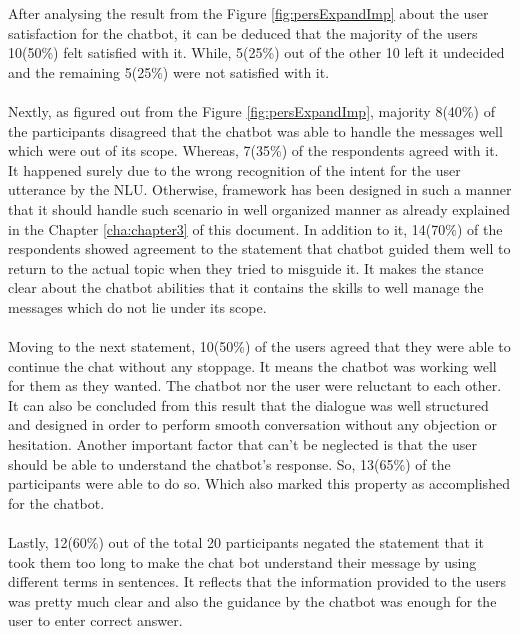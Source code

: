 After analysing the result from the Figure \ref{fig:persExpandImp} about the user satisfaction for the chatbot, it can be deduced that the majority of the users 10(50\%) felt satisfied with it. While, 5(25\%) out of the other 10 left it undecided and the remaining 5(25\%) were not satisfied with it.
\\~\\
Nextly, as figured out from the Figure \ref{fig:persExpandImp}, majority 8(40\%) of the participants disagreed that the chatbot was able to handle the messages well which were out of its scope. Whereas, 7(35\%) of the respondents agreed with it. It happened surely due to the wrong recognition of the intent for the user utterance by the NLU. Otherwise, framework has been designed in such a manner that it should handle such scenario in well organized manner as already explained in the Chapter \ref{cha:chapter3} of this document. In addition to it, 14(70\%) of the respondents showed agreement to the statement that chatbot guided them well to return to the actual topic when they tried to misguide it. It makes the stance clear about the chatbot abilities that it contains the skills to well manage the messages which do not lie under its scope.
\\~\\
Moving to the next statement, 10(50\%) of the users agreed that they were able to continue the chat without any stoppage. It means the chatbot was working well for them as they wanted. The chatbot nor the user were reluctant to each other. It can also be concluded from this result that the dialogue was well structured and designed in order to perform smooth conversation without any objection or hesitation. Another important factor that can't be neglected is that the user should be able to understand the chatbot's response. So, 13(65\%) of the participants were able to do so. Which also marked this property as accomplished for the chatbot.
\\~\\
Lastly, 12(60\%) out of the total 20 participants negated the statement that it took them too long to make the chat bot understand their message by using different terms in sentences. It reflects that the information provided to the users was pretty much clear and also the guidance by the chatbot was enough for the user to enter correct answer.

